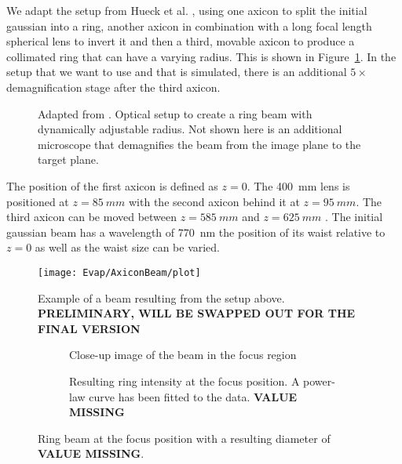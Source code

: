 We adapt the setup from Hueck et al. \cite{PhysRevLett.120.060402}, using one axicon \cite{McLeod} to split the initial gaussian into a ring, another axicon in combination with a long focal length spherical lens to invert it and then a third, movable axicon to produce a collimated ring that can have a varying radius. This is shown in Figure~\ref{fig:axicon_setup}. In the setup that we want to use and that is simulated, there is an additional $5\times$ demagnification stage after the third axicon.
\begin{figure}[htbp]
    \centering
    
    \caption[Optical setup to create a ring beam with dynamically adjustable radius]{Adapted from \cite{axiconSM}. Optical setup to create a ring beam with dynamically adjustable radius. Not shown here is an additional microscope that demagnifies the beam from the image plane to the target plane.}
    \label{fig:axicon_setup}
\end{figure}
The position of the first axicon is defined as $z=0$. The \SI{400}{mm} lens is positioned at $z=\SI{85}{mm}$ with the second axicon behind it at $z=\SI{95}{mm}$. The third axicon can be moved between $z=\SI{585}{mm}$ and $z=\SI{625}{mm}$ .
The initial gaussian beam has a wavelength of \SI{770}{nm} the position of its waist relative to $z=0$ as well as the waist size can be varied.

\begin{figure}[htbp]
    \centering
    \texttt{[image: Evap/AxiconBeam/plot]}
    \caption{Example of a beam resulting from the setup above. \textbf{PRELIMINARY, WILL BE SWAPPED OUT FOR THE FINAL VERSION}}
    \label{fig:axiconBeam}
\end{figure}

\begin{figure}[htbp]
    \centering
    \begin{subfigure}[t]{0.49\textwidth}
        \centering
        \caption{Close-up image of the beam in the focus region}
    \end{subfigure}
    \begin{subfigure}[t]{0.49\textwidth}
        \centering
        \caption{Resulting ring intensity at the focus position. A power-law curve has been fitted to the data. \textbf{VALUE MISSING}}
    \end{subfigure}
    \caption{Ring beam at the focus position with a resulting diameter of \textbf{VALUE MISSING}.}
    \label{fig:axiconBeamResult1}
\end{figure}
